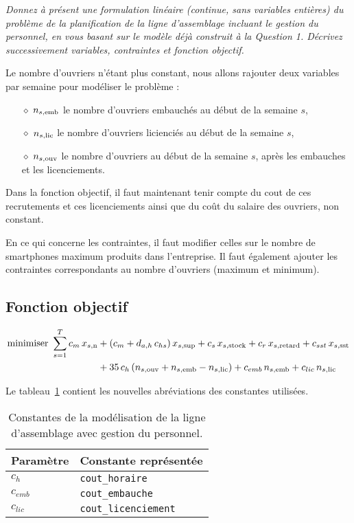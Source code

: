 \question %
\emph{Donnez à présent une formulation linéaire (continue, sans variables
entières) du problème de la planification de la ligne d'assemblage
incluant le gestion du personnel, en vous basant sur le modèle déjà 
construit à la Question 1. Décrivez successivement variables, 
contraintes et fonction objectif.}

Le nombre d'ouvriers n'étant plus constant, nous allons rajouter deux variables
par semaine pour modéliser le problème :
\begin{itemize}
  \item[$\diamond$] $n_{s,\text{emb}}$ le nombre d'ouvriers embauchés au début de la semaine $s$,
  \item[$\diamond$] $n_{s,\text{lic}}$ le nombre d'ouvriers licienciés au début de la semaine $s$,
  \item[$\diamond$] $n_{s,\text{ouv}}$ le nombre d'ouvriers au début de la semaine $s$,
  après les embauches et les licenciements.
\end{itemize}

Dans la fonction objectif, il faut maintenant tenir compte du cout de 
ces recrutements et ces licenciements 
ainsi que du coût du salaire des ouvriers, non constant.

En ce qui concerne les contraintes, il faut modifier celles sur 
le nombre de smartphones maximum produits dans l'entreprise. 
Il faut également ajouter les contraintes correspondants 
au nombre d'ouvriers (maximum et minimum).

\subsection*{Fonction objectif}
\begin{align*}
  \mbox{minimiser } 
  \sum_{s=1}^{T} 
  c_m\, x_{s,\text{n}} &+ (c_m + d_{a,h} \, c_{hs})\, x_{s,\text{sup}}
  + c_s\, x_{s,\text{stock}} + c_r\, x_{s,\text{retard}} + c_{sst}\, x_{s,\text{sst}} \\
  &+ 35 \, c_{h} \, (n_{s,\text{ouv}} + n_{s,\text{emb}} - n_{s,\text{lic}})  
  + c_{emb} \, n_{s,\text{emb}} + c_{lic} \, n_{s,\text{lic}}
\end{align*}

Le tableau~\ref{tab:constantesQuestion7} contient les nouvelles abréviations
des constantes utilisées.
\begin{table}[h]
  \begin{center}
  \begin{tabular}{|l|l|}
    \hline
    Paramètre & Constante représentée \\
    \hline
    \hline
    $c_{h}$ & \texttt{cout\_horaire} \\
    \hline
    $c_{emb}$ & \texttt{cout\_embauche} \\
    \hline
    $c_{lic}$ & \texttt{cout\_licenciement} \\
    \hline
  \end{tabular}
  \caption{Constantes de la modélisation de la ligne d'assemblage
  avec gestion du personnel.}
  \label{tab:constantesQuestion7}
  \end{center}
\end{table}


